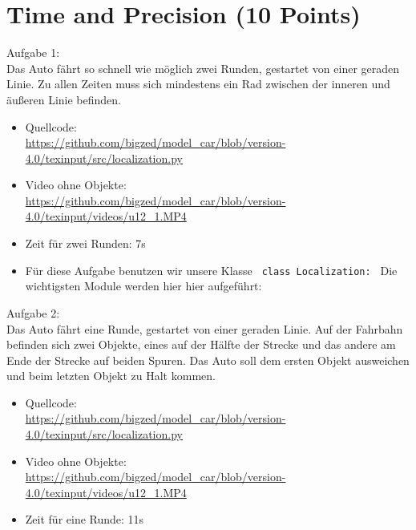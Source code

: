 \documentclass[10pt,oneside,a4paper]{article}
\begin{document}
  \section{Time and Precision (10 Points)}
    Aufgabe 1: \\
    Das Auto fährt so schnell wie möglich zwei Runden, gestartet von einer geraden Linie. Zu allen Zeiten muss sich mindestens ein Rad zwischen der inneren und äußeren Linie befinden.
    
    \begin{itemize}
	\item Quellcode:  \\ \url{https://github.com/bigzed/model_car/blob/version-4.0/texinput/src/localization.py}
	\item Video ohne Objekte: \\ \url{https://github.com/bigzed/model_car/blob/version-4.0/texinput/videos/u12_1.MP4}
	\item Zeit für zwei Runden: 7s 
	\item Für diese Aufgabe benutzen wir unsere Klasse \texttt{ class Localization: } Die wichtigsten Module werden hier hier aufgeführt:
	\end{itemize}
    
    Aufgabe 2: \\
    Das Auto fährt eine Runde, gestartet von einer geraden Linie. Auf der Fahrbahn befinden sich zwei Objekte, eines auf der Hälfte der Strecke und das andere am Ende der Strecke auf beiden Spuren. Das Auto soll dem ersten Objekt ausweichen und beim letzten Objekt zu Halt kommen.

    \begin{itemize}
	\item Quellcode:  \\ \url{https://github.com/bigzed/model_car/blob/version-4.0/texinput/src/localization.py}
	\item Video ohne Objekte: \\
	\url{https://github.com/bigzed/model_car/blob/version-4.0/texinput/videos/u12_1.MP4}
	\item Zeit für eine Runde: 11s
	\end{itemize}
    
\end{document}
